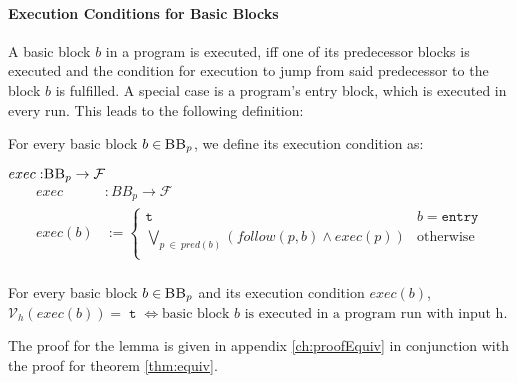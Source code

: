 \paragraph{Execution Conditions for Basic Blocks}
A basic block $b$ in a program is executed, iff one of its predecessor blocks is executed and the condition for execution to jump from said predecessor to the block $b$ is fulfilled. A special case is a program's entry block, which is executed in every run. This leads to the following definition: 

\begin{definition}\label{def:exec}
    For every basic block $b \in \: \mbb_p$, we define its execution condition as:
    \begin{center}
        $exec: \mbb_p \to \mbform$\\
        \begin{align*}
            exec &: BB_p \to \mathcal{F}\\
            exec(b) &:= \begin{cases}
                \mttt &  b = \mathtt{entry}\\
                \bigvee\limits_{p \: \in \: pred(b)} \left( follow(p, b) \land exec(p) \right) & \text{otherwise}\\
        \end{cases}\\
        \end{align*}
    \end{center}
\end{definition}

\begin{lemma}\label{lemma:exec}
    For every basic block $b \in \: \mbb_p$ and its execution condition $exec(b)$, \\ $\mathcal{V}_h(exec(b)) = \mttt \iff \text{basic block $b$ is executed in a program run with input h}$.
\end{lemma}
The proof for the lemma is given in appendix \ref{ch:proofEquiv} in conjunction with the proof for theorem \ref{thm:equiv}.
